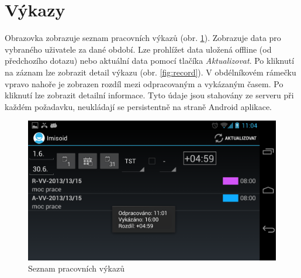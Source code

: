 \documentclass{diplomka}
\begin{document}
\section{Výkazy}
\label{sec:records}
Obrazovka zobrazuje seznam pracovních výkazů (obr. \ref{fig:records}). Zobrazuje data pro vybraného uživatele za dané období. Lze prohlížet data uložená offline (od předchozího dotazu) nebo aktuální data pomocí tlačíka \emph{Aktualizovat}. Po kliknutí na záznam lze zobrazit detail výkazu (obr. \ref{fig:record}). V obdélníkovém rámečku vpravo nahoře je zobrazen rozdíl mezi odpracovaným a vykázaným časem. Po kliknutí lze zobrazit detailní informace. Tyto údaje jsou stahovány ze serveru při každém požadavku, neukládají se persistentně na straně Android aplikace.
\vspace{-1.5mm}
\begin{figure}[H]
  \centering
  \includegraphics[scale=0.25]{scr/records.png}
    \caption{Seznam pracovních výkazů}
  \label{fig:records}
\end{figure}
\end{document}
